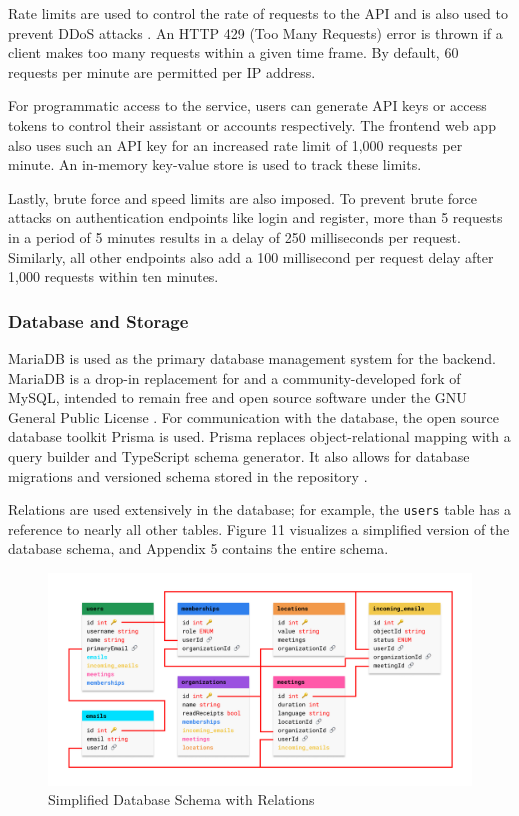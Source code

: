 \documentclass{article}
\begin{document}
Rate limits are used to control the rate of requests to the API and is also used to prevent DDoS attacks \cite{noauthor_rate_nodate}. An HTTP 429 (Too Many Requests) error is thrown if a client makes too many requests within a given time frame. By default, 60 requests per minute are permitted per IP address.

For programmatic access to the service, users can generate API keys or access tokens to control their assistant or accounts respectively. The frontend web app also uses such an API key for an increased rate limit of 1,000 requests per minute. An in-memory key-value store is used to track these limits.

Lastly, brute force and speed limits are also imposed. To prevent brute force attacks on authentication endpoints like login and register, more than 5 requests in a period of 5 minutes results in a delay of 250 milliseconds per request. Similarly, all other endpoints also add a 100 millisecond per request delay after 1,000 requests within ten minutes.

\subsubsection{Database and Storage}

MariaDB is used as the primary database management system for the backend. MariaDB is a drop-in replacement for and a community-developed fork of MySQL, intended to remain free and open source software under the GNU General Public License \cite{noauthor_mariadb/server_2020}. For communication with the database, the open source database toolkit Prisma is used. Prisma replaces object-relational mapping with a query builder and TypeScript schema generator. It also allows for database migrations and versioned schema stored in the repository \cite{noauthor_prisma/prisma_2020}.

Relations are used extensively in the database; for example, the \texttt{users} table has a reference to nearly all other tables. Figure 11 visualizes a simplified version of the database schema, and Appendix 5 contains the entire schema.

\begin{figure}[h]
	\includegraphics[width=\textwidth]{database-basic.png}
	\caption{Simplified Database Schema with Relations}
\end{figure}
\end{document}
